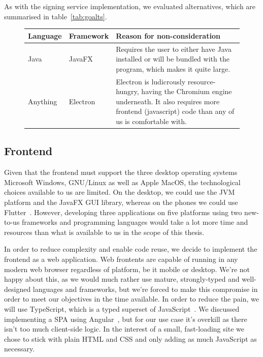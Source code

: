As with the signing service implementation, we evaluated alternatives, which are summarised in table~\ref{tab:goalts}.

\begin{figure}
    \begin{center}
        \begin{tabular}{p{1.5cm}|p{2cm}|p{11cm}}
            \textbf{Language} & \textbf{Framework} & \textbf{Reason for non-consideration} \\
            \hline
            Java & JavaFX & Requires the user to either have Java installed or will be bundled with the program, which makes it quite large.  \\
            \hline
            Anything & Electron & Electron is ludicrously resource-hungry, having the Chromium engine underneath. It also requires more frontend (javascript) code than any of us is comfortable with. \\
        \end{tabular}
    \end{center}
\end{figure}


\subsection{Frontend}
\label{subsec:techfrontend}

Given that the frontend must support the three desktop operating systems Microsoft Windows,
GNU/Linux as well as Apple MacOS,
the technological choices available to us are limited.
On the desktop, we could use the \gls{JVM} platform and the JavaFX \gls{GUI} library, whereas on the phones
we could use Flutter~\cite{flutterframework}.
However, developing three applications on five platforms using two new-to-us frameworks and programming languages
would take a lot more time and resources than what is available to us in the scope of this thesis.

In order to reduce complexity and enable code reuse, we decide to implement the frontend as a web application.
Web frontents are capable of running in any modern web browser regardless of platform, be it mobile or desktop.
We're not happy about this, as we would much rather use mature, strongly-typed and well-designed languages and frameworks,
but we're forced to make this compromise in order to meet our objectives in the time available.
In order to reduce the pain, we will use TypeScript, which is a typed superset of JavaScript~\cite{loltypes}.
We discussed implementing a \gls{SPA} using Angular~\cite{angular},
but for our use case it's overkill as there isn't too much client-side logic.
In the interest of a small, fast-loading site we chose to stick with plain \gls{HTML} and \gls{CSS}
and only adding as much JavaScript as necessary.

